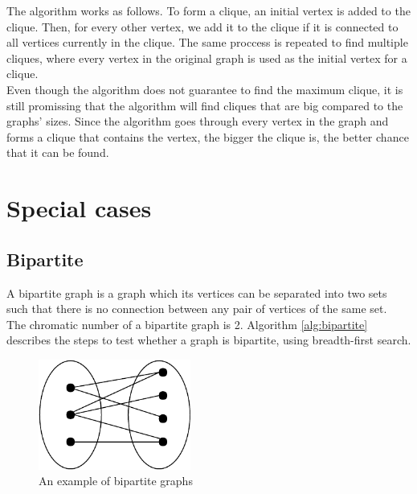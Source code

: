 \documentclass[a4paper]{report}
\begin{document}
		The algorithm works as follows. To form a clique, an initial vertex is added to the clique. Then, for every other vertex, we add it to the clique if it is connected to all vertices currently in the clique. The same proccess is repeated to find multiple cliques, where every vertex in the original graph is used as the initial vertex for a clique. \\
		
		Even though the algorithm does not guarantee to find the maximum clique, it is still promissing that the algorithm will find cliques that are big compared to the graphs' sizes. Since the algorithm goes through every vertex in the graph and forms a clique that contains the vertex, the bigger the clique is, the better chance that it can be found.
		
		\section{Special cases}
			\subsection{Bipartite}
			A bipartite graph is a graph which its vertices can be separated into two sets such that there is no connection between any pair of vertices of the same set.\\
			The chromatic number of a bipartite graph is 2. Algorithm \ref{alg:bipartite} \cite{sedgewick2003} describes the steps to test whether a graph is bipartite, using breadth-first search. \\
			
			\begin{figure}[h]
				\centering
				\includegraphics[width=50mm,scale=0.5]{figures/bipartite.pdf}
				\caption{An example of bipartite graphs}
				\label{fig:bipartite}
			\end{figure}
			
\end{document}
